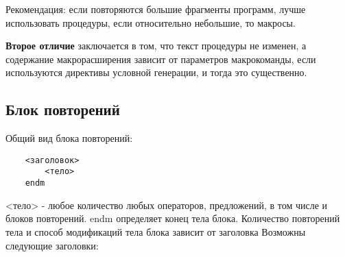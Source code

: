 Рекомендация: если повторяются большие фрагменты программ, лучше использовать процедуры, если относительно небольшие, то макросы.

\textbf{Второе отличие} заключается в том, что текст процедуры не изменен, а содержание макрорасширения зависит от параметров макрокоманды, если используются директивы условной генерации, и тогда это существенно.

\subsection{Блок повторений}
Общий вид блока повторений:
\begin{verbatim}
    <заголовок>
        <тело>
    endm
\end{verbatim}

<тело> - любое количество любых операторов, предложений, в том числе и блоков повторений.
endm определяет конец тела блока. Количество повторений тела и способ модификаций тела блока зависит от заголовка
Возможны следующие заголовки:
